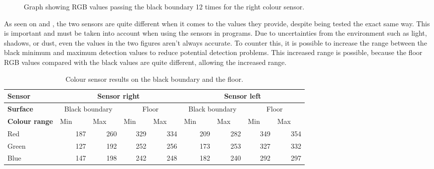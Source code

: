 \begin{figure}[H]
     \caption{\label{fig:colour_sensor_test_right} Graph showing RGB values passing the black boundary 12 times for the right colour sensor.}
\end{figure}

As seen on  and , the two sensors are quite different when it comes to the values they provide, despite being tested the exact same way. This is important and must be taken into account when using the sensors in programs. Due to uncertainties from the environment such as light, shadows, or dust, even the values in the two figures aren't always accurate. To counter this, it is possible to increase the range between the black minimum and maximum detection values to reduce potential detection problems. This increased range is possible, because the floor RGB values compared with the black values are quite different, allowing the increased range.

\begin{table}[H]
	\centering
    \begin{tabular}{|l|r|r|r|r|r|r|r|r|}
    \hline
    \rowcolor{DGray}
    \textbf{Sensor} & \multicolumn{4}{c|}{Sensor right} & \multicolumn{4}{c|}{Sensor left} \\ \hline
    \rowcolor{Gray}
    \textbf{Surface} & \multicolumn{2}{c|}{Black boundary} & \multicolumn{2}{c|}{Floor} & \multicolumn{2}{c|}{Black boundary} & \multicolumn{2}{c|}{Floor}   \\ \hline
    \rowcolor{DGray}
    \textbf{Colour range}  & Min~~~~ & Max~~~ & Min~~~ & Max~~~ & Min~~~~ & Max~~~ & Min~~~ & Max~~~ \\ \hline
\multicolumn{1}{|l|}{Red}  & 187     & 260    & 329    & 334    & 209     & 282    & 349    & 354    \\ \hline
\multicolumn{1}{|l|}{Green}& 127     & 192    & 252    & 256    & 173     & 253    & 327    & 332    \\ \hline
\multicolumn{1}{|l|}{Blue} & 147     & 198    & 242    & 248    & 182     & 240    & 292    & 297    \\
    \hline
    \end{tabular}
    \caption{\label{table:colour_sensor_test} Colour sensor results on the black boundary and the floor.}
\end{table}

